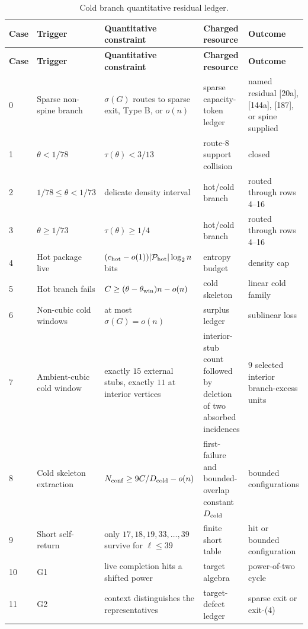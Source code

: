 \documentclass[11pt]{article}
\begin{document}
\begin{longtable}{C{0.05\textwidth} L{0.22\textwidth} L{0.22\textwidth} L{0.20\textwidth} L{0.21\textwidth}}
\caption{Cold branch quantitative residual ledger.}\label{tab:cold-branch-ledger}\\
\toprule
\textbf{Case} & \textbf{Trigger} & \textbf{Quantitative constraint} & \textbf{Charged resource} & \textbf{Outcome} \\
\midrule
\endfirsthead
\toprule
\textbf{Case} & \textbf{Trigger} & \textbf{Quantitative constraint} & \textbf{Charged resource} & \textbf{Outcome} \\
\midrule
{} & Sparse non-spine branch & \(\sigma(G)\) routes to sparse exit, Type B, or \(o(n)\) & sparse capacity-token ledger & named residual [20a], [144a], [187], or spine supplied \\
1 & \(\theta<1/78\) & \(\tau(\theta)<3/13\) & route-8 support collision & closed \\
2 & \(1/78\le\theta<1/73\) & delicate density interval & hot/cold branch & routed through rows 4--16 \\
3 & \(\theta\ge1/73\) & \(\tau(\theta)\ge1/4\) & hot/cold branch & routed through rows 4--16 \\
4 & Hot package live & \((c_{\rm hot}-o(1))|\mathcal P_{\rm hot}|\log_2 n\) bits & entropy budget & density cap \\
5 & Hot branch fails & \(C\ge(\theta-\theta_{\rm win})n-o(n)\) & cold skeleton & linear cold family \\
6 & Non-cubic cold windows & at most \(\sigma(G)=o(n)\) & surplus ledger & sublinear loss \\
7 & Ambient-cubic cold window & exactly \(15\) external stubs, exactly \(11\) at interior vertices & interior-stub count followed by deletion of two absorbed incidences & \(9\) selected interior branch-excess units \\
8 & Cold skeleton extraction & \(N_{\rm conf}\ge9C/D_{\rm cold}-o(n)\) & first-failure and bounded-overlap constant \(D_{\rm cold}\) & bounded configurations \\
9 & Short self-return & only \(17,18,19,33,\ldots,39\) survive for \(\ell\le39\) & finite short table & hit or bounded configuration \\
10 & G1 & live completion hits a shifted power & target algebra & power-of-two cycle \\
11 & G2 & context distinguishes the representatives & target-defect ledger & sparse exit or exit-\textup{(4)} \\

\end{longtable}
\end{document}
